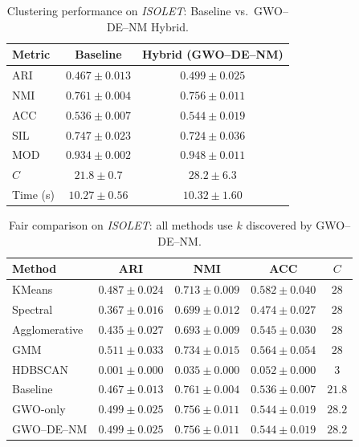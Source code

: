 \begin{table}[htbp]
\centering
\caption{Clustering performance on \textit{ISOLET}: Baseline vs.\ GWO--DE--NM Hybrid.}
\label{tab:isolet}
\begin{tabular}{lcc}
\toprule
Metric & Baseline & Hybrid (GWO--DE--NM) \\
\midrule
ARI & $0.467 \pm 0.013$ & $\mathbf{0.499 \pm 0.025}$ \\
NMI & $\mathbf{0.761 \pm 0.004}$ & $0.756 \pm 0.011$ \\
ACC & $0.536 \pm 0.007$ & $\mathbf{0.544 \pm 0.019}$ \\
SIL & $\mathbf{0.747 \pm 0.023}$ & $0.724 \pm 0.036$ \\
MOD & $0.934 \pm 0.002$ & $\mathbf{0.948 \pm 0.011}$ \\
\midrule
$C$ & $21.8 \pm 0.7$ & $28.2 \pm 6.3$ \\
Time (s) & $10.27 \pm 0.56$ & $10.32 \pm 1.60$ \\
\bottomrule
\end{tabular}
\end{table}

\begin{table}[htbp]
\centering\small
\caption{Fair comparison on \textit{ISOLET}: all methods use $k$ discovered by GWO--DE--NM.}
\label{tab:fair_isolet}
\begin{tabular}{lcccc}
\toprule
Method & ARI & NMI & ACC & $C$ \\
\midrule
KMeans & $0.487 \pm 0.024$ & $0.713 \pm 0.009$ & $0.582 \pm 0.040$ & $28$ \\
Spectral & $0.367 \pm 0.016$ & $0.699 \pm 0.012$ & $0.474 \pm 0.027$ & $28$ \\
Agglomerative & $0.435 \pm 0.027$ & $0.693 \pm 0.009$ & $0.545 \pm 0.030$ & $28$ \\
GMM & $\mathbf{0.511 \pm 0.033}$ & $0.734 \pm 0.015$ & $0.564 \pm 0.054$ & $28$ \\
HDBSCAN & $0.001 \pm 0.000$ & $0.035 \pm 0.000$ & $0.052 \pm 0.000$ & $3$ \\
\midrule
Baseline & $0.467 \pm 0.013$ & $0.761 \pm 0.004$ & $0.536 \pm 0.007$ & $21.8$ \\
GWO-only & $0.499 \pm 0.025$ & $0.756 \pm 0.011$ & $0.544 \pm 0.019$ & $28.2$ \\
GWO--DE--NM & $0.499 \pm 0.025$ & $0.756 \pm 0.011$ & $0.544 \pm 0.019$ & $28.2$ \\
\bottomrule
\end{tabular}
\end{table}

